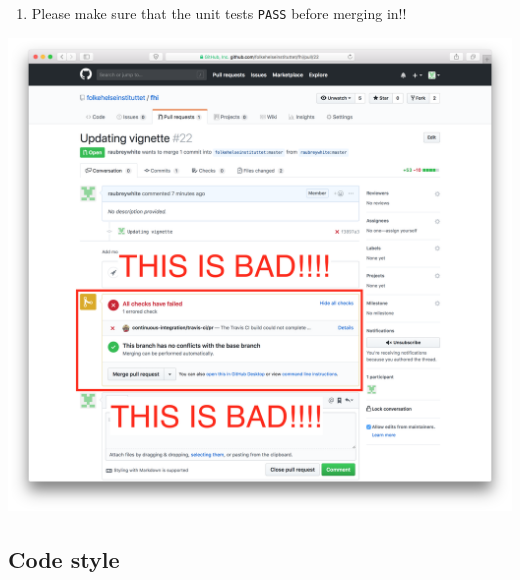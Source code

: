 \documentclass[12pt,]{article}
\providecommand{\tightlist}{%
  \setlength{\itemsep}{0pt}\setlength{\parskip}{0pt}}
\begin{document}
\begin{enumerate}
\def\labelenumi{\arabic{enumi}.}
\setcounter{enumi}{6}
\tightlist
\item
  Please make sure that the unit tests \texttt{PASS} before merging in!!
\end{enumerate}

\includegraphics{images/pull_request_checks_failed.png}

\subsection{Code style}\label{code-style}
\end{document}
